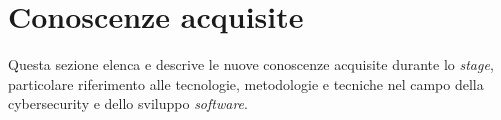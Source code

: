 \section{Conoscenze acquisite}
Questa sezione elenca e descrive le nuove conoscenze acquisite durante lo \textit{stage}, particolare riferimento alle tecnologie, metodologie e tecniche nel campo della cybersecurity e dello sviluppo \textit{software}.